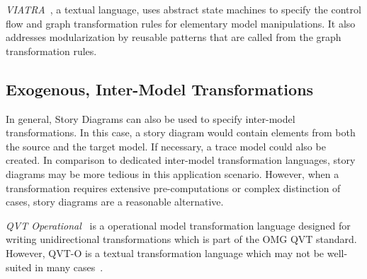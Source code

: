 \emph{VIATRA}~\cite{viatra}, a textual language, uses abstract state machines to specify the control flow and graph transformation rules for elementary model manipulations.
It also addresses modularization by reusable patterns that are called from the graph transformation rules. 



\subsection{Exogenous, Inter-Model Transformations}

In general, Story Diagrams can also be used to specify inter-model transformations.
In this case, a story diagram would contain elements from both the source and the target model.
If necessary, a trace model could also be created.
In comparison to dedicated inter-model transformation languages, story diagrams may be more tedious in this application scenario.
However, when a transformation requires extensive pre-computations or complex distinction of cases, story diagrams are a reasonable alternative.

\emph{QVT Operational}~\cite{QVT} is a operational model transformation language designed for writing unidirectional transformations which is part of the OMG QVT standard. %
However, QVT-O is a textual transformation language which may not be well-suited in many cases~\cite{Moo09}.

